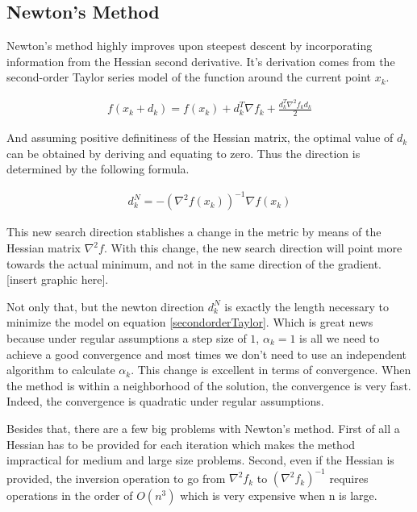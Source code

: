 \subsection{Newton's Method}

Newton's method highly improves upon steepest descent by incorporating information from the Hessian second derivative.   It's derivation comes from the second-order Taylor series model of the function around the current point $x_k$. 

\begin{equation} \label{secondorderTaylor}
  \begin{aligned}
    f(x_k + d_k) = f(x_k) + d_k^T \nabla f_k + \frac{d_k^T \nabla ^2 f_k d_k}{2}  
  \end{aligned}
\end{equation}

And assuming positive definitiness of the Hessian matrix, the optimal value of $d_k$ can be obtained by deriving and equating to zero.  Thus the direction is determined by the following formula.

\begin{equation} \label{NewtonDir}
  \begin{aligned}
    d_k^N = -\left(\nabla^2 f(x_k) \right)^{-1} \nabla f(x_k)
  \end{aligned}
\end{equation}

This new search direction stablishes a change in the metric by means of the Hessian matrix $\nabla ^2 f$.  With this change, the new search direction will point more towards the actual minimum, and not in the same direction of the gradient. [insert graphic here].

Not only that, but the newton direction $d_k^N$ is exactly the length necessary to minimize the model on equation \ref{secondorderTaylor}.  Which is great news because under regular assumptions a step size of $1$, $\alpha_k = 1$ is all we need to achieve a good convergence and most times we don't need to use an independent algorithm to calculate $\alpha_k$.  This change is excellent in terms of convergence.  When the method is within a neighborhood of the solution, the convergence is very fast.  Indeed, the convergence is quadratic under regular assumptions\citep{nocedal}.

Besides that, there are a few big problems with Newton's method.  First of all a Hessian has to be provided for each iteration which makes the method impractical for medium and large size problems.  Second, even if the Hessian is provided, the inversion operation to go from $\nabla^2 f_k$ to $\left(\nabla^2 f_k \right)^{-1}$ requires operations in the order of $O(n^3)$ which is very expensive when n is large.

